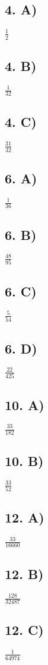 \documentclass[12]{scrartcl}
\begin{document}
\subsection*{4. A)}
$\frac{1}{2}$
\subsection*{4. B)}
$\frac{1}{32}$
\subsection*{4. C)}
$\frac{31}{32}$
\subsection*{6. A)}
$\frac{1}{36}$
\subsection*{6. B)}
$\frac{48}{95}$
\subsection*{6. C)}
$\frac{5}{54}$
\subsection*{6. D)}
$\frac{22}{425}$
\subsection*{10. A)}
$\frac{33}{182}$
\subsection*{10. B)}
$\frac{33}{52}$
\subsection*{12. A)}
$\frac{33}{16660}$
\subsection*{12. B)}
$\frac{128}{32487}$
\subsection*{12. C)}
$\frac{1}{64974}$
\end{document}
